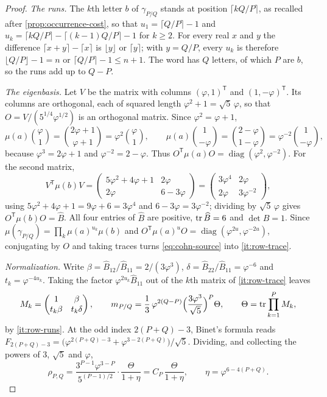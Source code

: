 \begin{proof}
\emph{The runs.} The $k$th letter $b$ of $\gamma_{P/Q}$ stands at position
$\lceil kQ/P\rceil$, as recalled after \cref{prop:occurrence-cost}, so that
$u_1=\lceil Q/P\rceil-1$ and
$u_k=\lceil kQ/P\rceil-\lceil(k-1)Q/P\rceil-1$ for $k\geqslant2$. For every real
$x$ and $y$ the difference $\lceil x+y\rceil-\lceil x\rceil$ is $\lfloor y\rfloor$
or $\lceil y\rceil$; with $y=Q/P$, every $u_k$ is therefore
$\lfloor Q/P\rfloor-1=n$ or $\lceil Q/P\rceil-1\leqslant n+1$. The word has $Q$
letters, of which $P$ are $b$, so the runs add up to $Q-P$.

\emph{The eigenbasis.} Let $V$ be the matrix with columns
$(\varphi,1)^{\mathsf T}$ and $(1,-\varphi)^{\mathsf T}$. Its columns are
orthogonal, each of squared length $\varphi^2+1=\sqrt5\,\varphi$, so that
$O=V/(5^{1/4}\varphi^{1/2})$ is an orthogonal matrix. Since
$\varphi^2=\varphi+1$,
$$
 \mu(a)\binom\varphi1=\binom{2\varphi+1}{\varphi+1}=\varphi^2\binom\varphi1,
 \qquad
 \mu(a)\binom1{-\varphi}=\binom{2-\varphi}{1-\varphi}=\varphi^{-2}\binom1{-\varphi},
$$
because $\varphi^3=2\varphi+1$ and $\varphi^{-2}=2-\varphi$. Thus
$O^{\mathsf T}\mu(a)O=\operatorname{diag}(\varphi^2,\varphi^{-2})$. For the second
matrix,
$$
 V^{\mathsf T}\mu(b)V=
 \begin{pmatrix}5\varphi^2+4\varphi+1&2\varphi\\2\varphi&6-3\varphi\end{pmatrix}
 =\begin{pmatrix}3\varphi^4&2\varphi\\2\varphi&3\varphi^{-2}\end{pmatrix},
$$
using $5\varphi^2+4\varphi+1=9\varphi+6=3\varphi^4$ and $6-3\varphi=3\varphi^{-2}$;
dividing by $\sqrt5\,\varphi$ gives $O^{\mathsf T}\mu(b)O=\widehat B$. All four
entries of $\widehat B$ are positive, $\operatorname{tr}\widehat B=6$ and $\det\widehat B=1$.
Since $\mu(\gamma_{P/Q})=\prod_k\mu(a)^{u_k}\mu(b)$ and
$O^{\mathsf T}\mu(a)^{u}O=\operatorname{diag}(\varphi^{2u},\varphi^{-2u})$, conjugating
by $O$ and taking traces turns \eqref{eq:cohn-source} into \ref{it:row-trace}.

\emph{Normalization.} Write $\beta=\widehat B_{12}/\widehat B_{11}=2/(3\varphi^3)$,
$\delta=\widehat B_{22}/\widehat B_{11}=\varphi^{-6}$ and $t_k=\varphi^{-4u_k}$. Taking
the factor $\varphi^{2u_k}\widehat B_{11}$ out of the $k$th matrix of \ref{it:row-trace} leaves
$$
 M_k=\begin{pmatrix}1&\beta\\t_k\beta&t_k\delta\end{pmatrix},\qquad
 m_{P/Q}=\frac13\,\varphi^{2(Q-P)}\Bigl(\frac{3\varphi^3}{\sqrt5}\Bigr)^P\Theta,
 \qquad \Theta=\operatorname{tr}\prod_{k=1}^PM_k ,
$$
by \ref{it:row-runs}. At the odd index $2(P+Q)-3$, Binet's formula reads
$F_{2(P+Q)-3}=\bigl(\varphi^{2(P+Q)-3}+\varphi^{3-2(P+Q)}\bigr)/\sqrt5$. Dividing,
and collecting the powers of $3$, $\sqrt5$ and $\varphi$,
$$
 \rho_{P,Q}
 =\frac{3^{P-1}\varphi^{3-P}}{5^{(P-1)/2}}\cdot\frac{\Theta}{1+\eta}
 =C_P\,\frac{\Theta}{1+\eta},\qquad \eta=\varphi^{6-4(P+Q)} .
$$


\end{proof}

